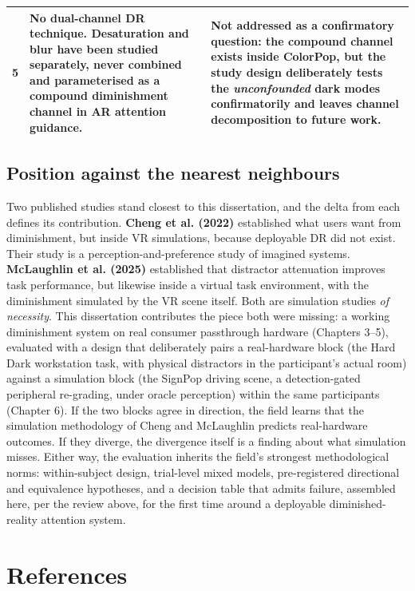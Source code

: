 \begin{longtable}{|p{}|p{}|p{}|}
\hline
5 & \textbf{No dual-channel DR technique.} Desaturation and blur have been studied separately, never combined and parameterised as a compound diminishment channel in AR attention guidance. & Not addressed as a confirmatory question: the compound channel exists inside ColorPop, but the study design deliberately tests the \textit{unconfounded} dark modes confirmatorily and leaves channel decomposition to future work. \\
\hline
\end{longtable}

\subsection{Position against the nearest neighbours}

Two published studies stand closest to this dissertation, and the delta from each defines its
contribution. \textbf{Cheng et al. (2022)} established what users want from diminishment, but inside VR
simulations, because deployable DR did not exist. Their study is a perception-and-preference study
of imagined systems. \textbf{McLaughlin et al. (2025)} established that distractor attenuation improves
task performance, but likewise inside a virtual task environment, with the diminishment simulated
by the VR scene itself. Both are simulation studies \textit{of necessity}. This dissertation contributes
the piece both were missing: a working diminishment system on real consumer passthrough hardware
(Chapters 3–5), evaluated with a design that deliberately pairs a real-hardware block (the Hard Dark
workstation task, with physical distractors in the participant's actual room) against a
simulation block (the SignPop driving scene, a detection-gated peripheral re-grading, under oracle
perception) within the same participants
(Chapter 6). If the two blocks agree in direction, the field learns that the simulation methodology
of Cheng and McLaughlin predicts real-hardware outcomes. If they diverge, the divergence itself is a
finding about what simulation misses. Either way, the evaluation inherits the field's strongest
methodological norms: within-subject design, trial-level mixed models, pre-registered directional
and equivalence hypotheses, and a decision table that admits failure, assembled here, per the
review above, for the first time around a deployable diminished-reality attention system.

\section*{References}

